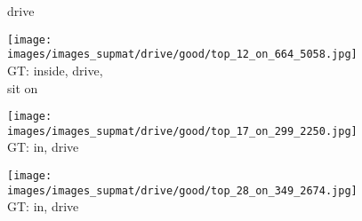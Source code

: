 \documentclass[10pt,twocolumn,letterpaper]{article}
\begin{document}
\begin{figure*}[t]
	\begin{minipage}[t]{0.005\textwidth}
    	\centering
	\vspace{-8.5ex}
    	\begin{turn}{90}
    	drive
    	\end{turn}
    	\vspace{2ex}
   	\end{minipage}
    \hspace{0.01\textwidth}
    \begin{minipage}[t]{0.18\textwidth}
    	\centering
       	\texttt{[image: images/images\_supmat/drive/good/top\_12\_on\_664\_5058.jpg]}\\
       	\vspace{0.3ex}
       	GT: inside, drive, \\
       	sit on
       	\vspace{2ex}
    \end{minipage}
    \hspace{0.005\textwidth}
    \begin{minipage}[t]{0.18\textwidth}
    	\centering
       	\texttt{[image: images/images\_supmat/drive/good/top\_17\_on\_299\_2250.jpg]}\\
       	\vspace{0.3ex}
       	GT: in, drive
       	\vspace{0.2ex}
    \end{minipage}  
    \hspace{0.005\textwidth}
    \begin{minipage}[t]{0.18\textwidth}
    	\centering
       	\texttt{[image: images/images\_supmat/drive/good/top\_28\_on\_349\_2674.jpg]}\\
       	\vspace{0.3ex}
       	GT: in, drive
       	\vspace{0.2ex}
    \end{minipage} 
    \hspace{0.005\textwidth}
    \begin{minipage}[t]{0.18\textwidth}

\end{minipage}
\end{figure*}
\end{document}

